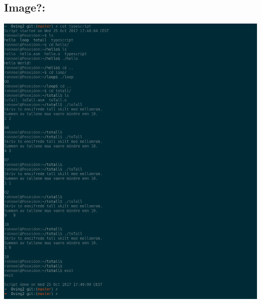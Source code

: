 \documentclass[norsk, a4paper, 12pt,]{article}
\begin{document}
\subsection{Image?:}
\centerline{\includegraphics[scale=0.4]{figures/screenshot}}
\end{document}
